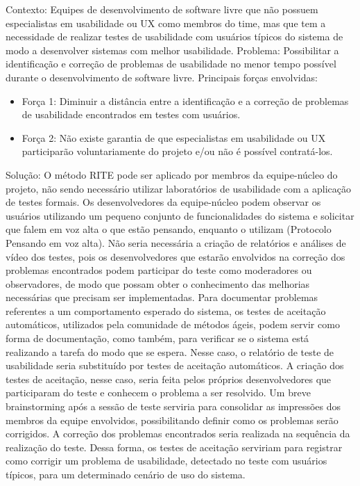 Contexto: Equipes de desenvolvimento de software livre que não possuem especialistas em usabilidade ou UX como membros do time, mas que tem a necessidade de realizar testes de usabilidade com usuários típicos do sistema de modo a desenvolver sistemas com melhor usabilidade.
Problema: Possibilitar a identificação e correção de problemas de usabilidade no menor tempo possível durante o desenvolvimento de software livre. Principais forças envolvidas:
\begin{itemize}
\item Força 1: Diminuir a distância entre a identificação e a correção de problemas de usabilidade encontrados em testes com usuários.
\item Força 2: Não existe garantia de que especialistas em usabilidade ou UX participarão voluntariamente do projeto e/ou não é possível contratá-los.
\end{itemize}
Solução: O método RITE pode ser aplicado por membros da equipe-núcleo do projeto, não sendo
necessário utilizar laboratórios de usabilidade com a aplicação de testes formais. Os desenvolvedores da equipe-núcleo podem observar os usuários utilizando um pequeno conjunto de funcionalidades do sistema e solicitar que falem em voz alta o que estão pensando, enquanto o utilizam (Protocolo Pensando em voz alta). Não seria necessária a criação de relatórios e análises de vídeo dos testes, pois os desenvolvedores que estarão envolvidos na correção dos problemas encontrados podem participar do teste como moderadores ou observadores, de modo que possam obter o conhecimento das melhorias necessárias que precisam ser implementadas. Para documentar problemas referentes a um comportamento esperado do sistema, os testes de aceitação automáticos, utilizados pela comunidade de métodos ágeis, podem servir como forma de documentação, como também, para verificar se o sistema está realizando a tarefa do modo que se espera. Nesse caso, o relatório de teste de usabilidade seria substituído por testes de aceitação automáticos. A criação dos testes de aceitação, nesse caso, seria feita pelos próprios desenvolvedores que participaram do teste e conhecem o problema a ser resolvido. Um breve brainstorming após a sessão de teste serviria para consolidar as impressões dos membros da equipe envolvidos, possibilitando definir como os problemas serão corrigidos. A correção dos problemas encontrados seria realizada na sequência da realização do teste. Dessa forma, os testes de aceitação serviriam para registrar como corrigir um problema de usabilidade, detectado no teste com usuários típicos, para um determinado cenário de uso do sistema.


